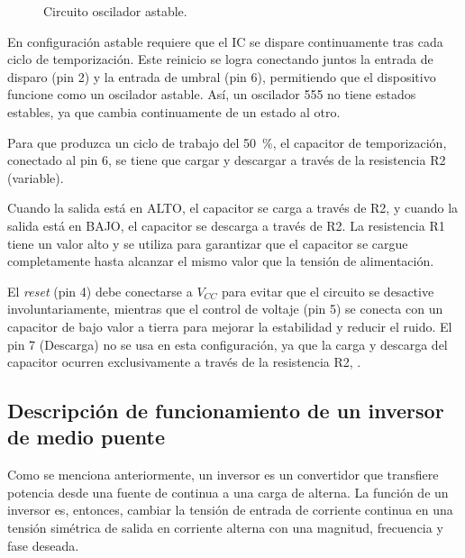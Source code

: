 \begin{figure}[H]
{
    }
    \caption{Circuito oscilador astable.}
    \label{fig:inversor:IC555}
\end{figure}

En configuración astable requiere que el IC se dispare continuamente tras cada ciclo de temporización. Este reinicio se logra conectando juntos la entrada de disparo (pin 2) y la entrada de umbral (pin 6), permitiendo que el dispositivo funcione como un oscilador astable. Así, un oscilador 555 no tiene estados estables, ya que cambia continuamente de un estado al otro. 

Para que produzca un ciclo de trabajo del \SI{50}{\percent}, el capacitor de temporización, conectado al pin 6, se tiene que cargar y descargar a través de la resistencia R2 (variable).

Cuando la salida está en ALTO, el capacitor se carga a través de R2, y cuando la salida está en BAJO, el capacitor se descarga a través de R2. La resistencia R1 tiene un valor alto y se utiliza para garantizar que el capacitor se cargue completamente hasta alcanzar el mismo valor que la tensión de alimentación.  

El \textit{reset} (pin 4) debe conectarse a $V_{CC}$ para evitar que el circuito se desactive involuntariamente, mientras que el control de voltaje (pin 5) se conecta con un capacitor de bajo valor a tierra para mejorar la estabilidad y reducir el ruido. El pin 7 (Descarga) no se usa en esta configuración, ya que la carga y descarga del capacitor ocurren exclusivamente a través de la resistencia R2, \parencite{electronics-tutorial-555}.


\subsection{Descripción de funcionamiento de un inversor de medio puente}

Como se menciona anteriormente, un inversor es un convertidor que transfiere potencia desde una fuente de continua a una carga de alterna. La función de un inversor es, entonces, cambiar la tensión de entrada de corriente continua en una tensión simétrica de salida en corriente alterna con una magnitud, frecuencia y fase deseada.

